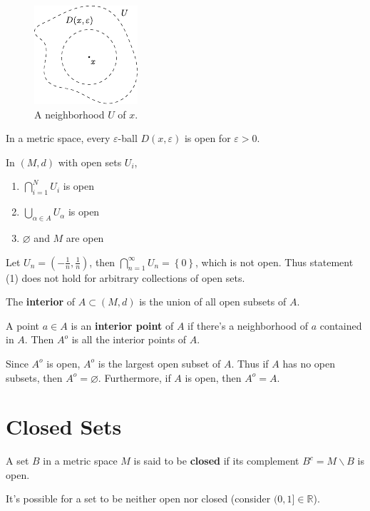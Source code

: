 \documentclass[twoside,10pt]{report}
\begin{document}
\begin{figure}[H]
	\centering
	\includegraphics[scale=2]{fig/neighborhood.pdf}
	\caption{A neighborhood $U$ of $x$.}
\end{figure}

\begin{prop}
	In a metric space, every $\varepsilon$-ball $D(x,\varepsilon)$ is open for $\varepsilon>0$.
\end{prop}

\begin{prop}
	In $(M,d)$ with open sets $U_i$,
	\begin{enumerate}
		\item $\bigcap_{i=1}^N U_i$ is open
		\item $\bigcup_{\alpha \in A} U_\alpha$ is open
		\item $\varnothing$ and $M$ are open
	\end{enumerate}
\end{prop}

\begin{ex}[]
	Let $U_n = \left( -\frac{1}{n}, \frac{1}{n} \right)$, then $\bigcap_{n=1}^\infty U_n = \left\{ 0 \right\}$, which is not open. Thus statement (1) does not hold for arbitrary collections of open sets.
\end{ex}

\begin{defn}[]
	The \textbf{interior} of $A \subset (M,d)$ is the union of all open subsets of $A$.
\end{defn}

A point $a \in A$ is an \textbf{interior point} of $A$ if there's a neighborhood of $a$ contained in $A$. Then $A^{o}$ is all the interior points of $A$.

Since $A^o$ is open, $A^o$ is the largest open subset of $A$. Thus if $A$ has no open subsets, then $A^o=\varnothing$. Furthermore, if $A$ is open, then $A^o=A$.



\section{Closed Sets}
\begin{defn}[]
	A set $B$ in a metric space $M$ is said to be \textbf{closed} if its complement $B^c = M\backslash B$ is open.
\end{defn}
It's possible for a set to be neither open nor closed (consider $(0,1] \in \mathbb{R}$).
\end{document}
